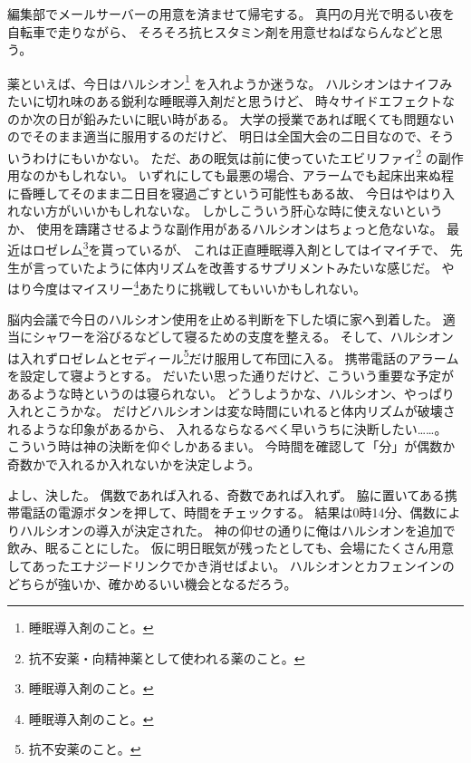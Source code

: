 編集部でメールサーバーの用意を済ませて帰宅する。
真円の月光で明るい夜を自転車で走りながら、
そろそろ抗ヒスタミン剤を用意せねばならんなどと思う。

薬といえば、今日はハルシオン\footnote{睡眠導入剤のこと。}%
を入れようか迷うな。
ハルシオンはナイフみたいに切れ味のある鋭利な睡眠導入剤だと思うけど、
時々サイドエフェクトなのか次の日が鉛みたいに眠い時がある。
大学の授業であれば眠くても問題ないのでそのまま適当に服用するのだけど、
明日は全国大会の二日目なので、そういうわけにもいかない。
ただ、あの眠気は前に使っていたエビリファイ\footnote{抗不安薬・向精神薬として使われる薬のこと。}%
の副作用なのかもしれない。
いずれにしても最悪の場合、アラームでも起床出来ぬ程に昏睡してそのまま二日目を寝過ごすという可能性もある故、
今日はやはり入れない方がいいかもしれないな。
しかしこういう肝心な時に使えないというか、
使用を躊躇させるような副作用があるハルシオンはちょっと危ないな。
最近はロゼレム\footnote{睡眠導入剤のこと。}を貰っているが、
これは正直睡眠導入剤としてはイマイチで、
先生が言っていたように体内リズムを改善するサプリメントみたいな感じだ。
やはり今度はマイスリー\footnote{睡眠導入剤のこと。}あたりに挑戦してもいいかもしれない。

脳内会議で今日のハルシオン使用を止める判断を下した頃に家へ到着した。
適当にシャワーを浴びるなどして寝るための支度を整える。
そして、ハルシオンは入れずロゼレムとセディール\footnote{抗不安薬のこと。}だけ服用して布団に入る。
携帯電話のアラームを設定して寝ようとする。
だいたい思った通りだけど、こういう重要な予定があるような時というのは寝られない。
どうしようかな、ハルシオン、やっぱり入れとこうかな。
だけどハルシオンは変な時間にいれると体内リズムが破壊されるような印象があるから、
入れるならなるべく早いうちに決断したい……。
こういう時は神の決断を仰ぐしかあるまい。
今時間を確認して「分」が偶数か奇数かで入れるか入れないかを決定しよう。

よし、決した。
偶数であれば入れる、奇数であれば入れず。
脇に置いてある携帯電話の電源ボタンを押して、時間をチェックする。
結果は0時14分、偶数によりハルシオンの導入が決定された。
神の仰せの通りに俺はハルシオンを追加で飲み、眠ることにした。
仮に明日眠気が残ったとしても、会場にたくさん用意してあったエナジードリンクでかき消せばよい。
ハルシオンとカフェンインのどちらが強いか、確かめるいい機会となるだろう。
